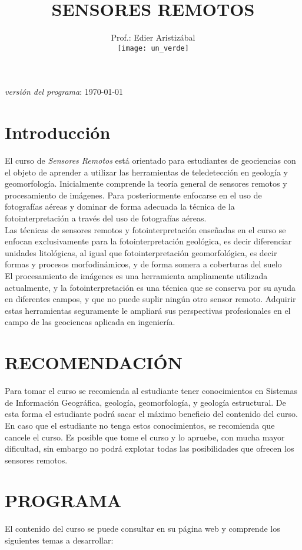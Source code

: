 \documentclass[a4paper,twoside,11pt,]{article}
\title {SENSORES REMOTOS}
\author{Prof.: Edier Aristizábal\\[5ex]
\texttt{[image: un\_verde]}}
\date{}
\begin{document}
\maketitle

\begin{center}
\emph {versión del programa}: \today
\end{center}

\section* {Introducción}
El curso de \emph{Sensores Remotos} está orientado para estudiantes de geociencias con el objeto de aprender a utilizar las herramientas de teledetección en geología y geomorfología. Inicialmente comprende la teoría general de sensores remotos y procesamiento de imágenes. Para posteriormente enfocarse en el uso de fotografías aéreas y dominar de forma adecuada la técnica de la fotointerpretación a través del uso de fotografías aéreas.\\ 
Las técnicas de sensores remotos y fotointerpretación enseñadas en el curso se enfocan exclusivamente para la fotointerpretación geológica, es decir diferenciar unidades litológicas, al igual que fotointerpretación geomorfológica, es decir formas y procesos morfodinámicos, y de forma somera a coberturas del suelo\\
El procesamiento de imágenes es una herramienta ampliamente utilizada actualmente, y la fotointerpretación es una técnica que se conserva por su ayuda en diferentes campos, y que no puede suplir ningún otro sensor remoto. Adquirir estas herramientas seguramente le ampliará sus perspectivas profesionales en el campo de las geociencas aplicada en ingeniería.

\section{RECOMENDACIÓN}
Para tomar el curso se recomienda al estudiante tener conocimientos en Sistemas de Información Geográfica, geología, geomorfología, y geología estructural. De esta forma el estudiante podrá sacar el máximo beneficio del contenido del curso.\\
En caso que el estudiante no tenga estos conocimientos, se recomienda que cancele el curso. Es posible que tome el curso y lo apruebe, con mucha mayor dificultad, sin embargo no podrá explotar todas las posibilidades que ofrecen los sensores remotos.

\section{PROGRAMA}
El contenido del curso se puede consultar en su página web  y comprende los siguientes temas a desarrollar:\\
\end{document}
